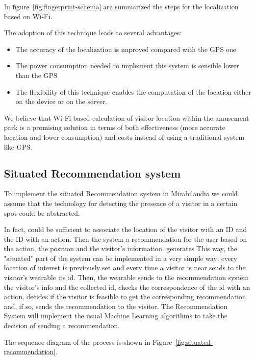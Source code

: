 In figure~\ref{fig:fingerprint-schema} are summarized the steps for the localization based on Wi-Fi.

The adoption of this technique leads to several advantages:
\begin{itemize}
	\item The accuracy of the localization is improved compared with the GPS one~\cite{du2018hybrid}
	\item The power consumption needed to implement this system is sensible lower than the GPS~\cite{du2018hybrid}
	\item The flexibility of this technique enables the computation of the location either on the device or on the server.
\end{itemize}

We believe that Wi-Fi-based calculation of visitor location within the amusement park is a promising solution in terms of both effectiveness (more
accurate location and lower consumption) and costs instead of using a traditional system like GPS.


\subsection{Situated Recommendation system}
To implement the situated Recommendation system in Mirabilandia we could assume that the technology for detecting the presence of a visitor in a certain spot could be abstracted.

In fact, could be sufficient to associate the location of the visitor with an ID and the ID with an action. Then the system  a recommendation for the user based on the action, the position and the visitor's information.
generates
This way, the "situated" part of the system can be implemented in a very simple way:
every location of interest is previously set and every time a visitor is near sends to the visitor's wearable its id.
Then, the wearable sends to the recommendation system the visitor's info and the collected id, checks the correspondence of the id with an action, decides if the visitor is feasible to get the corresponding recommendation and, if so, sends the recommendation to the visitor.
The Recommendation System will implement the usual Machine Learning algorithms to take the decision of sending a recommendation.

The sequence diagram of the process is shown in Figure~\ref{fig:situated-recommendation}.

